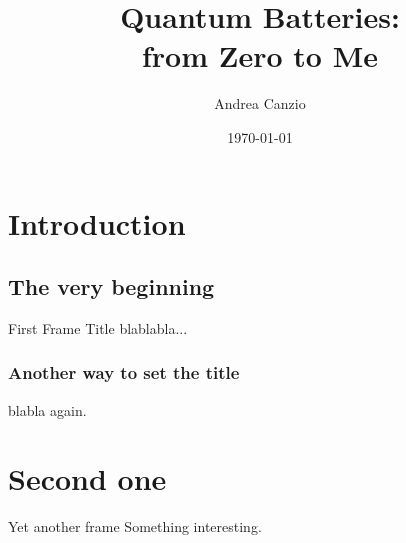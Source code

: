 \documentclass{beamer} %
\title{Quantum Batteries:\\ from Zero to Me}
\author{Andrea Canzio}
\institute{Scuola Normale Superiore}
\date{\today}
\begin{document}
\begin{frame}
    \titlepage
\end{frame}


\section{Introduction}
\subsection{The very beginning}

\begin{frame}{First Frame Title}
    blablabla...
\end{frame}

\begin{frame}
    \frametitle{Another way to set the title}
    blabla again.
\end{frame}

\section{Second one}

\begin{frame}{Yet another frame}
    Something interesting.
\end{frame}
\end{document}
